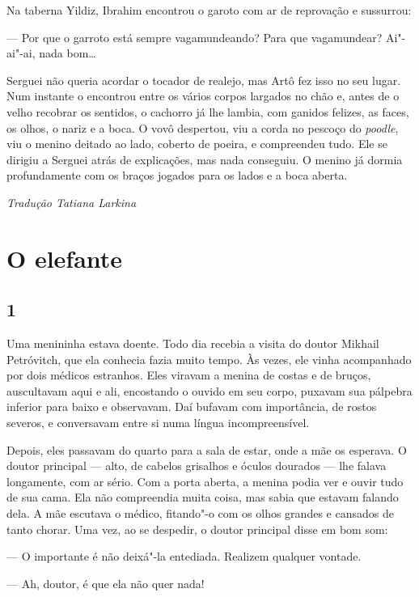Na taberna Yildiz, Ibrahim encontrou o garoto com ar de reprovação e
sussurrou:

--- Por que o garroto está sempre vagamundeando? Para que vagamundear?
Ai"-ai"-ai, nada bom\ldots{}

Serguei não queria acordar o tocador de realejo, mas Artô fez isso no seu
lugar. Num instante o encontrou entre os vários corpos largados no chão
e, antes de o velho recobrar os sentidos, o cachorro já lhe lambia, com
ganidos felizes, as faces, os olhos, o nariz e a boca. O vovô despertou,
viu a corda no pescoço do \emph{poodle}, viu o menino deitado ao lado,
coberto de poeira, e compreendeu tudo. Ele se dirigiu a Serguei atrás de
explicações, mas nada conseguiu. O menino já dormia profundamente com os
braços jogados para os lados e a boca aberta.


\medskip

{\footnotesize\hfill\emph{Tradução Tatiana Larkina}}

\chapter{O elefante} \label{part11}

\section{1}

\noindent{}Uma menininha estava doente. Todo dia recebia a visita do doutor
Mikhail Petróvitch, que ela conhecia fazia muito tempo. Às vezes, ele
vinha acompanhado por dois médicos estranhos. Eles viravam a menina de
costas e de bruços, auscultavam aqui e ali, encostando o ouvido em seu
corpo, puxavam sua pálpebra inferior para baixo e observavam. Daí bufavam com importância, de rostos severos, e conversavam entre si numa
língua incompreensível.

Depois, eles passavam do quarto para a sala de estar, onde a mãe os
esperava. O doutor principal --- alto, de cabelos grisalhos e óculos
dourados --- lhe falava longamente, com ar sério. Com a porta aberta, a
menina podia ver e ouvir tudo de sua cama. Ela não compreendia muita
coisa, mas sabia que estavam falando dela. A mãe escutava o médico,
fitando"-o com os olhos grandes e cansados de tanto chorar. Uma vez, ao
se despedir, o doutor principal disse em bom som:

--- O importante é não deixá"-la entediada. Realizem qualquer vontade.

--- Ah, doutor, é que ela não quer nada!

